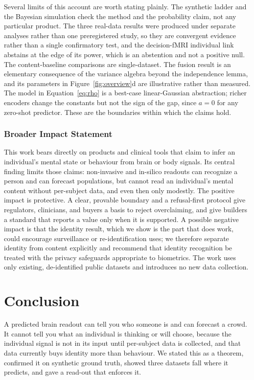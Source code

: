\documentclass{article}
\begin{document}
Several limits of this account are worth stating plainly. The synthetic ladder and the Bayesian simulation
check the method and the probability claim, not any particular product. The three real-data results were
produced under separate analyses rather than one preregistered study, so they are convergent evidence rather
than a single confirmatory test, and the decision-fMRI individual link abstains at the edge of its power,
which is an abstention and not a positive null. The content-baseline comparisons are single-dataset. The
fusion result is an elementary consequence of the variance algebra beyond the independence lemma, and its
parameters in Figure~\ref{fig:overview}d are illustrative rather than measured. The model in
Equation~\ref{eq:rho} is a best-case linear-Gaussian abstraction; richer encoders change the constants but
not the sign of the gap, since $a=0$ for any zero-shot predictor. These are the boundaries within which the
claims hold.

\subsubsection*{Broader Impact Statement}
This work bears directly on products and clinical tools that claim to infer an individual's mental state or
behaviour from brain or body signals. Its central finding limits those claims: non-invasive and in-silico
readouts can recognize a person and can forecast populations, but cannot read an individual's mental content
without per-subject data, and even then only modestly. The positive impact is protective. A clear, provable
boundary and a refusal-first protocol give regulators, clinicians, and buyers a basis to reject overclaiming,
and give builders a standard that reports a value only when it is supported. A possible negative impact is
that the identity result, which we show is the part that does work, could encourage surveillance or
re-identification uses; we therefore separate identity from content explicitly and recommend that identity
recognition be treated with the privacy safeguards appropriate to biometrics. The work uses only existing,
de-identified public datasets and introduces no new data collection.

\section{Conclusion}
A predicted brain readout can tell you who someone is and can forecast a crowd. It cannot tell you what an
individual is thinking or will choose, because the individual signal is not in its input until per-subject
data is collected, and that data currently buys identity more than behaviour. We stated this as a theorem,
confirmed it on synthetic ground truth, showed three datasets fall where it predicts, and gave a read-out
that enforces it.
\end{document}
